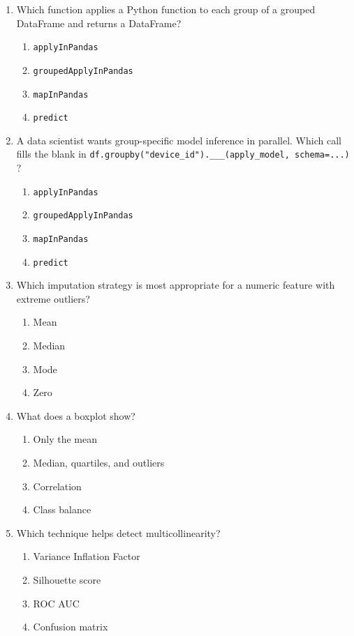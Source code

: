 \documentclass[11pt]{article}
\begin{document}
\begin{enumerate}[leftmargin=*, label=\textbf{Q\arabic*.}, start=39]
		\item Which function applies a Python function to each group of a grouped DataFrame and returns a DataFrame?
		\begin{enumerate}[label=(\alph*)]
			\item \texttt{applyInPandas}
			\item \texttt{groupedApplyInPandas}
			\item \texttt{mapInPandas}
			\item \texttt{predict}
		\end{enumerate}
		
		\item A data scientist wants group-specific model inference in parallel. Which call fills the blank in \texttt{df.groupby("device\_id").\_\_\_(apply\_model, schema=...) }?
		\begin{enumerate}[label=(\alph*)]
			\item \texttt{applyInPandas}
			\item \texttt{groupedApplyInPandas}
			\item \texttt{mapInPandas}
			\item \texttt{predict}
		\end{enumerate}
		
		\item Which imputation strategy is most appropriate for a numeric feature with extreme outliers?
		\begin{enumerate}[label=(\alph*)]
			\item Mean
			\item Median
			\item Mode
			\item Zero
		\end{enumerate}
		
		\item What does a boxplot show?
		\begin{enumerate}[label=(\alph*)]
			\item Only the mean
			\item Median, quartiles, and outliers
			\item Correlation
			\item Class balance
		\end{enumerate}
		
		\item Which technique helps detect multicollinearity?
		\begin{enumerate}[label=(\alph*)]
			\item Variance Inflation Factor
			\item Silhouette score
			\item ROC AUC
			\item Confusion matrix
		\end{enumerate}
		

\end{enumerate}
\end{document}
